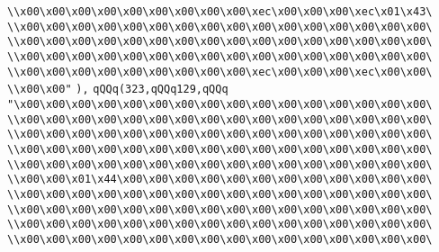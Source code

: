 \verb|\\x00\x00\x00\x00\x00\x00\x00\x00\x00\xec\x00\x00\x00\xec\x01\x43\|\newline
\verb|\\x00\x00\x00\x00\x00\x00\x00\x00\x00\x00\x00\x00\x00\x00\x00\x00\|\newline
\verb|\\x00\x00\x00\x00\x00\x00\x00\x00\x00\x00\x00\x00\x00\x00\x00\x00\|\newline
\verb|\\x00\x00\x00\x00\x00\x00\x00\x00\x00\x00\x00\x00\x00\x00\x00\x00\|\newline
\verb|\\x00\x00\x00\x00\x00\x00\x00\x00\x00\xec\x00\x00\x00\xec\x00\x00\|\newline
\verb|\\x00\x00"|\newline
\verb|),|\newline
\verb|qQQq(323,qQQq129,qQQq|\newline
\verb|"\x00\x00\x00\x00\x00\x00\x00\x00\x00\x00\x00\x00\x00\x00\x00\x00\|\newline
\verb|\\x00\x00\x00\x00\x00\x00\x00\x00\x00\x00\x00\x00\x00\x00\x00\x00\|\newline
\verb|\\x00\x00\x00\x00\x00\x00\x00\x00\x00\x00\x00\x00\x00\x00\x00\x00\|\newline
\verb|\\x00\x00\x00\x00\x00\x00\x00\x00\x00\x00\x00\x00\x00\x00\x00\x00\|\newline
\verb|\\x00\x00\x00\x00\x00\x00\x00\x00\x00\x00\x00\x00\x00\x00\x00\x00\|\newline
\verb|\\x00\x00\x01\x44\x00\x00\x00\x00\x00\x00\x00\x00\x00\x00\x00\x00\|\newline
\verb|\\x00\x00\x00\x00\x00\x00\x00\x00\x00\x00\x00\x00\x00\x00\x00\x00\|\newline
\verb|\\x00\x00\x00\x00\x00\x00\x00\x00\x00\x00\x00\x00\x00\x00\x00\x00\|\newline
\verb|\\x00\x00\x00\x00\x00\x00\x00\x00\x00\x00\x00\x00\x00\x00\x00\x00\|\newline
\verb|\\x00\x00\x00\x00\x00\x00\x00\x00\x00\x00\x00\x00\x00\x00\x00\x00\|\newline
